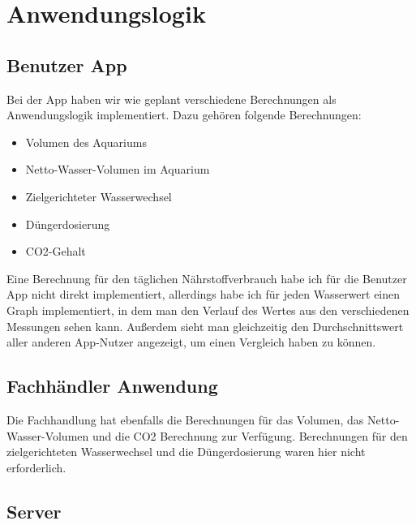 \section{Anwendungslogik}

\subsection{Benutzer App}

Bei der App haben wir wie geplant verschiedene Berechnungen als Anwendungslogik implementiert. Dazu gehören folgende Berechnungen:

\begin{itemize}
\item Volumen des Aquariums
\item Netto-Wasser-Volumen im Aquarium
\item Zielgerichteter Wasserwechsel
\item Düngerdosierung
\item CO2-Gehalt
\end{itemize}

Eine Berechnung für den täglichen Nährstoffverbrauch habe ich für die Benutzer App nicht direkt implementiert, allerdings habe ich für jeden Wasserwert einen Graph implementiert, in dem man den Verlauf des Wertes aus den verschiedenen Messungen sehen kann. Außerdem sieht man gleichzeitig den Durchschnittswert aller anderen App-Nutzer angezeigt, um einen Vergleich haben zu können.

\subsection{Fachhändler Anwendung}

Die Fachhandlung hat ebenfalls die Berechnungen für das Volumen, das Netto-Wasser-Volumen und die CO2 Berechnung zur Verfügung. Berechnungen für den zielgerichteten Wasserwechsel und die Düngerdosierung waren hier nicht erforderlich.

\subsection{Server}


